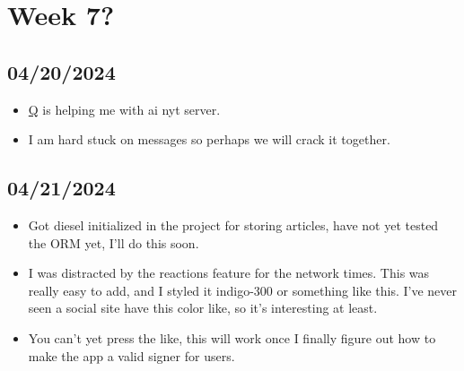 \newpage
\section{Week 7?}
\subsection*{04/20/2024}
\begin{itemize}
    \item \textcolor{blue}{\href{https://github.com/queazyg}{Q}} is helping me with ai nyt server.
    \item I am hard stuck on messages so perhaps we will crack it together.
\end{itemize}

\subsection*{04/21/2024}
\begin{itemize}
    \item Got diesel initialized in the project for storing articles, have not
        yet tested the ORM yet, I'll do this soon. 
    \item I was distracted by the reactions feature for the network times. This
        was really easy to add, and I styled it indigo-300 or something like
        this. I've never seen a social site have this color like, so it's
        interesting at least.
    \item You can't yet press the like, this will work once I finally figure out
        how to make the app a valid signer for users.
\end{itemize}
